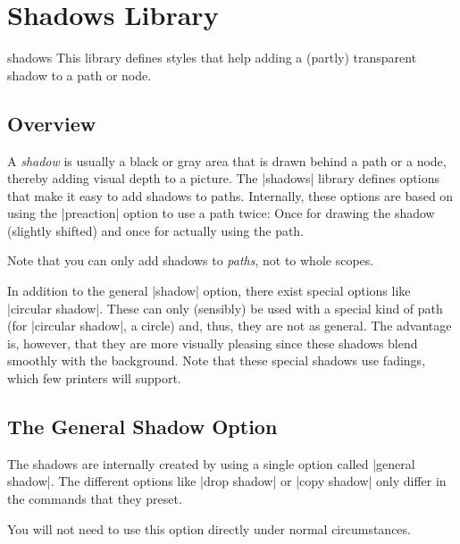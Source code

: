 %
%
%


\section[library-shadows]{Shadows Library}
\label{section-libs-shadows}

\begin{tikzlibrary}{shadows}
    This library defines styles that help adding a (partly) transparent shadow
    to a path or node.
\end{tikzlibrary}


\subsection{Overview}

A \emph{shadow} is usually a black or gray area that is drawn behind a path or
a node, thereby adding visual depth to a picture. The |shadows| library defines
options that make it easy to add shadows to paths. Internally, these options
are based on using the |preaction| option to use a path twice: Once for drawing
the shadow (slightly shifted) and once for actually using the path.

Note that you can only add shadows to \emph{paths}, not to whole scopes.

In addition to the general |shadow| option, there exist special options like
|circular shadow|. These can only (sensibly) be used with a special kind of
path (for |circular shadow|, a circle) and, thus, they are not as general. The
advantage is, however, that they are more visually pleasing since these shadows
blend smoothly with the background. Note that these special shadows use
fadings, which few printers will support.


\subsection{The General Shadow Option}

The shadows are internally created by using a single option called
|general shadow|. The different options like |drop shadow| or |copy shadow|
only differ in the commands that they preset.

You will not need to use this option directly under normal circumstances.

